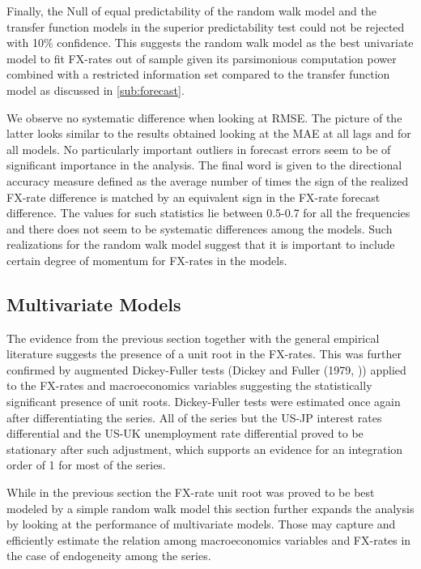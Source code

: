 Finally, the Null of equal predictability of the random walk model and the transfer function models in the superior predictability test could not be rejected
with 10\% confidence. This suggests the random walk model as the best univariate model to fit FX-rates out of sample given its parsimonious computation
power combined with a restricted information set compared to the transfer function model as discussed in \ref{sub:forecast}.

We observe no systematic difference when looking at RMSE. The picture of the latter looks similar to the results obtained looking at the MAE at all lags and for all models. No particularly important outliers in forecast errors seem to be of significant importance in the analysis.
The final word is given to the directional accuracy measure defined as the average number of times the sign of the realized FX-rate difference is matched by
an equivalent sign in the FX-rate forecast difference. The values for such statistics lie  between 0.5-0.7
for all the frequencies and there does not seem to be systematic differences among the models. Such realizations for the
random walk model suggest that it is important to include certain degree of momentum for FX-rates in the models.


\subsection{Multivariate Models}

The evidence from the previous section together with the general empirical literature suggests the presence of a unit root in the
FX-rates. This was further confirmed by augmented Dickey-Fuller tests (Dickey and Fuller (1979, \cite{DickeyFuller}))
applied to the FX-rates and macroeconomics variables suggesting the statistically significant presence of unit roots.
Dickey-Fuller tests were estimated once again after differentiating the series. All of the series but the US-JP interest rates
differential and the US-UK unemployment rate differential proved to be stationary after such adjustment, which supports an evidence
for an integration order of 1 for most of the series.

While in the previous section the FX-rate unit root was proved to be best modeled by a simple random walk model this section further
expands the analysis by looking at the performance of multivariate models. Those may capture and efficiently estimate the relation among
macroeconomics variables and FX-rates in the case of endogeneity among the series.

